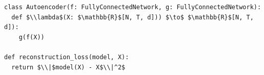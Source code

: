 \documentclass[border=10pt]{standalone}
\begin{document}
\begin{lstlisting}
class Autoencoder(f: FullyConnectedNetwork, g: FullyConnectedNetwork):
  def $\\lambda$(X: $\mathbb{R}$[N, T, d])) $\to$ $\mathbb{R}$[N, T, d]): 
    g(f(X))
    
def reconstruction_loss(model, X):
  return $\\|$model(X) - X$\\|^2$
\end{lstlisting}
\end{document}
